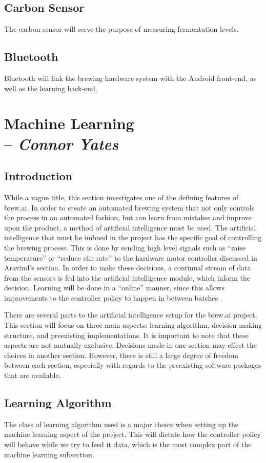 \documentclass[draftclsnofoot,onecolumn,letterpaper,10pt]{IEEEtran}
\begin{document}
\subsection{Carbon Sensor}
The carbon sensor will serve the purpose of measuring fermentation levels.

\subsection{Bluetooth}
Bluetooth will link the brewing hardware system with the Android front-end, as well as the learning back-end.

\section{Machine Learning \\ -- \textbf{\textit{Connor Yates}}}
\subsection{Introduction}
While a vague title, this section investigates one of the defining features of brew.ai.
In order to create an automated brewing system that not only controls the process in an automated fashion, but can learn from mistakes and improve upon the product, a method of artificial intelligence must be used.
The artificial intelligence that must be imbued in the project has the specific goal of controlling the brewing process.
This is done by sending high level signals such as ``raise temperature'' or ``reduce stir rate'' to the hardware motor controller discussed in Aravind's section.
In order to make these decisions, a continual stream of data from the sensors is fed into the artificial intelligence module, which inform the decision.
Learning will be done in a ``online'' manner, since this allows improvements to the controller policy to happen in between batches \cite{RussellNorvig}.

There are several parts to the artificial intelligence setup for the brew.ai project.
This section will focus on three main aspects: learning algorithm, decision making structure, and preexisting implementations.
It is important to note that these aspects are not mutually exclusive. 
Decisions made in one section may effect the choices in another section.
However, there is still a large degree of freedom between each section, especially with regards to the preexisting software packages that are available.

\subsection{Learning Algorithm}
The class of learning algorithm used is a major choice when setting up the machine learning aspect of the project.
This will dictate how the controller policy will behave while we try to feed it data, which is the most complex part of the machine learning subsection.
\end{document}
